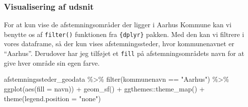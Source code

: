 \documentclass[
  a4paper,
  DIV=11,
  numbers=noendperiod,
  oneside]{scrartcl}
\newenvironment{Shaded}{\begin{snugshade}}{\end{snugshade}}
\newcommand{\AttributeTok}[1]{\textcolor[rgb]{0.40,0.45,0.13}{#1}}
\newcommand{\FunctionTok}[1]{\textcolor[rgb]{0.28,0.35,0.67}{#1}}
\newcommand{\NormalTok}[1]{\textcolor[rgb]{0.00,0.23,0.31}{#1}}
\newcommand{\SpecialCharTok}[1]{\textcolor[rgb]{0.37,0.37,0.37}{#1}}
\newcommand{\StringTok}[1]{\textcolor[rgb]{0.13,0.47,0.30}{#1}}
\begin{document}
{
\makeatletter
\def\LT@makecaption#1#2#3{%
  \noalign{\smash{\hbox{\kern\textwidth\rlap{\kern\marginparsep
  \parbox[t]{\marginparwidth}{%
    \footnotesize{%
      \vspace{(1.1\baselineskip)}
    #1{#2: }\ignorespaces #3}}}}}}%
    }
\makeatother

\begin{figure}[H]



\end{figure}%

}

\subsubsection{Visualisering af udsnit}\label{visualisering-af-udsnit}

For at kun vise de afstemningsområder der ligger i Aarhus Kommune kan vi
benytte os af \texttt{filter()} funktionen fra \texttt{\{dplyr\}}
pakken. Med den kan vi filtrere i vores dataframe, så der kun vises
afstemningssteder, hvor kommunenavnet er ``Aarhus''. Derudover har jeg
tilføjet et \texttt{fill} på afstemningsområdets navn for at give hver
område sin egen farve.

\begin{Shaded}
\begin{Highlighting}[]
\NormalTok{afstemningssteder\_geodata }\SpecialCharTok{\%\textgreater{}\%}
  \FunctionTok{filter}\NormalTok{(kommunenavn }\SpecialCharTok{==} \StringTok{"Aarhus"}\NormalTok{) }\SpecialCharTok{\%\textgreater{}\%}
  \FunctionTok{ggplot}\NormalTok{(}\FunctionTok{aes}\NormalTok{(}\AttributeTok{fill =}\NormalTok{ navn)) }\SpecialCharTok{+}
  \FunctionTok{geom\_sf}\NormalTok{() }\SpecialCharTok{+}
\NormalTok{  ggthemes}\SpecialCharTok{::}\FunctionTok{theme\_map}\NormalTok{() }\SpecialCharTok{+}
  \FunctionTok{theme}\NormalTok{(}\AttributeTok{legend.position =} \StringTok{"none"}\NormalTok{)}
\end{Highlighting}
\end{Shaded}
\end{document}
